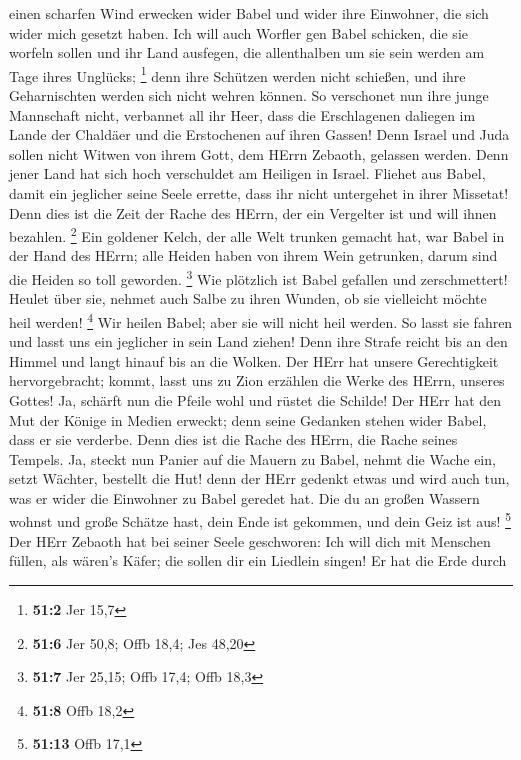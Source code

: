 einen scharfen Wind erwecken wider Babel und wider ihre Einwohner, die
sich wider mich gesetzt haben.  Ich will auch Worfler gen
Babel schicken, die sie worfeln sollen und ihr Land ausfegen, die
allenthalben um sie sein werden am Tage ihres Unglücks; \footnote{\textbf{51:2}
  Jer 15,7}  denn ihre Schützen werden nicht schießen, und
ihre Geharnischten werden sich nicht wehren können. So verschonet nun
ihre junge Mannschaft nicht, verbannet all ihr Heer,  dass
die Erschlagenen daliegen im Lande der Chaldäer und die Erstochenen auf
ihren Gassen!  Denn Israel und Juda sollen nicht Witwen von
ihrem Gott, dem HErrn Zebaoth, gelassen werden. Denn jener Land hat sich
hoch verschuldet am Heiligen in Israel.  Fliehet aus Babel,
damit ein jeglicher seine Seele errette, dass ihr nicht untergehet in
ihrer Missetat! Denn dies ist die Zeit der Rache des HErrn, der ein
Vergelter ist und will ihnen bezahlen. \footnote{\textbf{51:6} Jer 50,8;
  Offb 18,4; Jes 48,20}  Ein goldener Kelch, der alle Welt
trunken gemacht hat, war Babel in der Hand des HErrn; alle Heiden haben
von ihrem Wein getrunken, darum sind die Heiden so toll geworden.
\footnote{\textbf{51:7} Jer 25,15; Offb 17,4; Offb 18,3} 
Wie plötzlich ist Babel gefallen und zerschmettert! Heulet über sie,
nehmet auch Salbe zu ihren Wunden, ob sie vielleicht möchte heil werden!
\footnote{\textbf{51:8} Offb 18,2}  Wir heilen Babel; aber
sie will nicht heil werden. So lasst sie fahren und lasst uns ein
jeglicher in sein Land ziehen! Denn ihre Strafe reicht bis an den Himmel
und langt hinauf bis an die Wolken.  Der HErr hat unsere
Gerechtigkeit hervorgebracht; kommt, lasst uns zu Zion erzählen die
Werke des HErrn, unseres Gottes!  Ja, schärft nun die
Pfeile wohl und rüstet die Schilde! Der HErr hat den Mut der Könige in
Medien erweckt; denn seine Gedanken stehen wider Babel, dass er sie
verderbe. Denn dies ist die Rache des HErrn, die Rache seines Tempels.
 Ja, steckt nun Panier auf die Mauern zu Babel, nehmt die
Wache ein, setzt Wächter, bestellt die Hut! denn der HErr gedenkt etwas
und wird auch tun, was er wider die Einwohner zu Babel geredet hat.
 Die du an großen Wassern wohnst und große Schätze hast,
dein Ende ist gekommen, und dein Geiz ist aus! \footnote{\textbf{51:13}
  Offb 17,1}  Der HErr Zebaoth hat bei seiner Seele
geschworen: Ich will dich mit Menschen füllen, als wären's Käfer; die
sollen dir ein Liedlein singen!  Er hat die Erde durch
